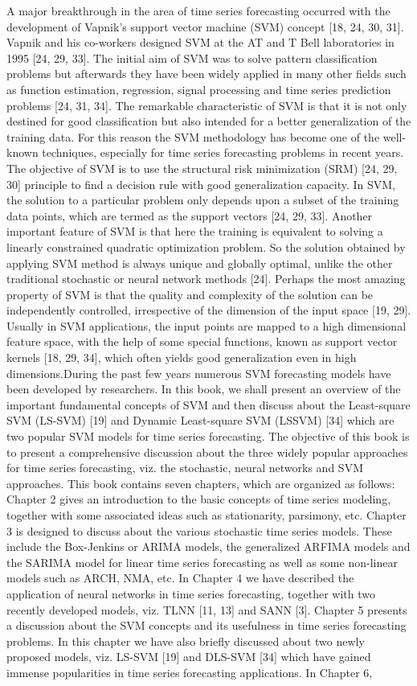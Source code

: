 \documentclass[12pt,a4paper]{article}
\begin{document}
	A major breakthrough in the area of time series forecasting occurred with the development of Vapnik’s support vector machine (SVM) concept [18, 24, 30, 31]. Vapnik and his co-workers designed SVM at the AT and T Bell laboratories in 1995 [24, 29, 33]. The initial aim of SVM was to solve pattern classification problems but afterwards they have been widely applied in many other fields such as function estimation, regression, signal processing and time
	series prediction problems [24, 31, 34]. The remarkable characteristic of SVM is that it is not only destined for good classification but also intended for a better generalization of the training data. For this reason the SVM methodology has become one of the well-known techniques, especially for time series forecasting problems in recent years. The objective of SVM is to use the structural risk minimization (SRM) [24, 29, 30] principle to find a decision rule with good generalization capacity. In SVM, the solution to a particular problem only depends upon a subset of the training data points, which are termed as the support vectors [24, 29, 33]. Another important feature of SVM is that here the training is equivalent to solving a linearly constrained quadratic optimization problem. So the solution obtained by applying SVM method is always unique and globally optimal, unlike the other traditional stochastic or neural network methods [24]. Perhaps the most amazing property of SVM is that the quality and complexity of the solution can be independently controlled, irrespective of the dimension of the input space [19, 29]. Usually in SVM applications, the input points are mapped to a high dimensional feature space, with the help of some special functions, known as support vector kernels [18, 29, 34], which often yields good generalization even in high dimensions.During
	the past few years numerous SVM forecasting models have been developed by researchers. In this book, we shall present an overview of the important fundamental concepts of SVM and then discuss about the Least-square SVM (LS-SVM) [19] and Dynamic Least-square SVM (LSSVM) [34] which are two popular SVM models for time series forecasting. The objective of this book is to present a comprehensive discussion about the three widely popular approaches for time series forecasting, viz. the stochastic, neural networks and SVM approaches. This book contains seven chapters, which are organized as follows: Chapter 2
	gives an introduction to the basic concepts of time series modeling, together with some associated ideas such as stationarity, parsimony, etc. Chapter 3 is designed to discuss about the various stochastic time series models. These include the Box-Jenkins or ARIMA models, the generalized ARFIMA models and the SARIMA model for linear time series forecasting as well as some non-linear models such as ARCH, NMA, etc. In Chapter 4 we have described the application of neural networks in time series forecasting, together with two recently developed models, viz. TLNN [11, 13] and SANN [3]. Chapter 5 presents a discussion about the SVM concepts and its usefulness in time series forecasting problems. In this chapter we have also briefly discussed about two newly proposed models, viz. LS-SVM [19] and DLS-SVM [34] which have gained immense popularities in time series forecasting applications. In Chapter 6,
\end{document}
